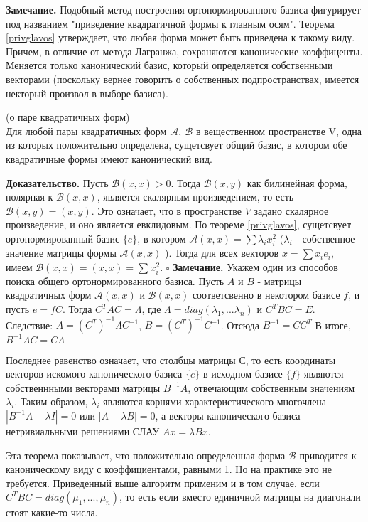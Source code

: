 \textbf{Замечание.} Подобный метод построения ортонормированного базиса
фигурирует под названием "приведение квадратичной формы к главным осям". 
Теорема
\ref{privglavos} утверждает, что любая форма может быть приведена к такому 
виду. Причем, в отличие от метода Лагранжа, сохраняются канонические 
коэффиценты. Меняется только канонический базис, который определяется 
собственными векторами (поскольку вернее говорить о собственных 
подпространствах, имеется некторый произвол в выборе базиса). 
\begin{theor}
(о паре квадратичных форм)\\
Для любой пары квадратичных форм $\mathcal A,~\mathcal B$ в вещественном 
пространстве V, одна из которых положительно определена, сущетсвует общий 
базис, в котором обе квадратичные формы имеют канонический вид. 
\end{theor}
\textbf{Доказательство.} Пусть $\mathcal B(x,x)>0$. Тогда $\mathcal B(x,y)$
как билинейная форма, полярная к $\mathcal B(x,x)$, является скалярным 
произведением, то
есть $\mathcal B(x,y)=(x,y)$. Это означает, что в пространстве $V$ задано 
скалярное произведение, и оно является евклидовым. По теореме \ref{privglavos},
сущетсвует ортонормированный базис $\{e\}$, в котором $\mathcal A(x,x)=
\sum\lambda_ix_i^2$ ($\lambda_i$ - собственное значение матрицы формы
$\mathcal A(x,x)$ ).
Тогда для всех векторов $x=\sum x_ie_i$, имеем $\mathcal B(x,x)=(x,x)=\sum
x_i^2$. $\square$
\textbf{Замечание.} Укажем один из способов поиска общего ортонормированного
базиса. Пусть $A$ и $B$ - матрицы квадратичных форм $\mathcal A(x,x)$ и
$\mathcal B(x,x)$ соответсвенно в некотором базисе $f$, и пусть $e=fC$.
Тогда $C^TAC=\Lambda$, где $\Lambda=diag(\lambda_1,...\lambda_n)$ и $C^TBC=E$.
Следствие: $A=(C^T)^{-1}\Lambda C^{-1}$, $B=(C^T)^{-1}C^{-1}$. Отсюда
$B^{-1}=CC^T$ В итоге, $B^{-1}AC=C\Lambda$

Последнее равенство означает, что столбцы матрицы С, то есть координаты 
векторов искомого канонического базиса
$\{e\}$ в исходном базисе $\{f\}$ являются собственнными векторами матрицы
$B^{-1}A$, отвечающим собственным значениям $\lambda_i$. Таким образом, 
$\lambda_i$ являются корнями характеристического многочлена
$|B^{-1}A-\lambda I|=0$ или $|A-\lambda B|=0$, а векторы канонического базиса
- нетривиальными решениями СЛАУ $Ax=\lambda Bx$.

Эта теорема показывает, что положительно определенная форма $\mathcal B$
приводится к каноническому виду с коэффициентами, равными 1. Но на практике 
это не
требуется. Приведенный выше алгоритм применим и в том случае, если
$C^TBC=diag(\mu_1,...,\mu_n)$, то есть если вместо единичной матрицы на
диагонали стоят какие-то
числа. 

